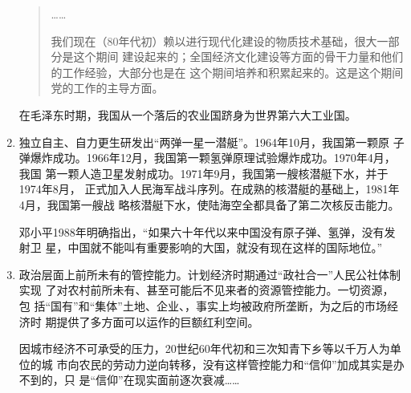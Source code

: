 \begin{enumerate}
\begin{quotation}
    ……

    我们现在（80年代初）赖以进行现代化建设的物质技术基础，很大一部分是这个期间
    建设起来的；全国经济文化建设等方面的骨干力量和他们的工作经验，大部分也是在
    这个期间培养和积累起来的。这是这个期间党的工作的主导方面。
  \end{quotation}

  在毛泽东时期，我国从一个落后的农业国跻身为世界第六大工业国。

\item 独立自主、自力更生研发出“两弹一星一潜艇”。1964年10月，我国第一颗原
  子弹爆炸成功。1966年12月，我国第一颗氢弹原理试验爆炸成功。1970年4月，我国
  第一颗人造卫星发射成功。1971年9月，我国第一艘核潜艇下水，并于1974年8月，
  正式加入人民海军战斗序列。在成熟的核潜艇的基础上，1981年4月，我国第一艘战
  略核潜艇下水，使陆海空全都具备了第二次核反击能力。

  邓小平1988年明确指出，“如果六十年代以来中国没有原子弹、氢弹，没有发射卫
  星，中国就不能叫有重要影响的大国，就没有现在这样的国际地位。”

\item 政治层面上前所未有的管控能力。计划经济时期通过“政社合一”人民公社体制实现
  了对农村前所未有、甚至可能后不见来者的资源管控能力。一切资源，包
  括“国有”和“集体”土地、企业、，事实上均被政府所垄断，为之后的市场经济时
  期提供了多方面可以运作的巨额红利空间。

  因城市经济不可承受的压力，20世纪60年代初和三次知青下乡等以千万人为单位的城
  市向农民的劳动力逆向转移，没有这样管控能力和“信仰”加成其实是办不到的，只
  是“信仰”在现实面前逐次衰减……
\end{enumerate}

